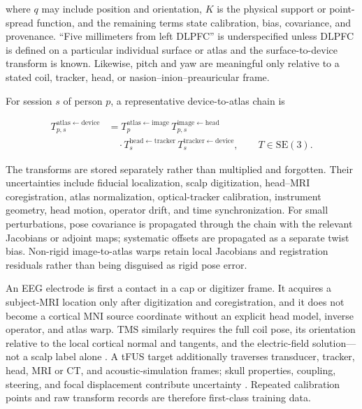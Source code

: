 where \(q\) may include position and orientation, \(K\) is the physical
support or point-spread function, and the remaining terms state calibration,
bias, covariance, and provenance. “Five millimeters from left DLPFC” is
underspecified unless DLPFC is defined on a particular individual surface or
atlas and the surface-to-device transform is known. Likewise, pitch and yaw
are meaningful only relative to a stated coil, tracker, head, or
nasion--inion--preauricular frame.

For session \(s\) of person \(p\), a representative device-to-atlas chain is

\[
\begin{aligned}
T^{\mathrm{atlas}\leftarrow\mathrm{device}}_{p,s}
&=T^{\mathrm{atlas}\leftarrow\mathrm{image}}_{p}\,
T^{\mathrm{image}\leftarrow\mathrm{head}}_{p,s}\\
&\quad{}\cdot
T^{\mathrm{head}\leftarrow\mathrm{tracker}}_{s}\,
T^{\mathrm{tracker}\leftarrow\mathrm{device}}_{s},
\qquad T\in\mathrm{SE}(3).
\end{aligned}
\tag{3}
\]

The transforms are stored separately rather than multiplied and forgotten.
Their uncertainties include fiducial localization, scalp digitization,
head--MRI coregistration, atlas normalization, optical-tracker calibration,
instrument geometry, head motion, operator drift, and time synchronization.
For small perturbations, pose covariance is propagated through the chain with
the relevant Jacobians or adjoint maps; systematic offsets are propagated as a
separate twist bias. Non-rigid image-to-atlas warps retain local Jacobians and
registration residuals rather than being disguised as rigid pose error.

An EEG electrode is first a contact in a cap or digitizer frame. It acquires a
subject-MRI location only after digitization and coregistration, and it does
not become a cortical MNI source coordinate without an explicit head model,
inverse operator, and atlas warp. TMS similarly requires the full coil pose,
its orientation relative to the local cortical normal and tangents, and the
electric-field solution---not a scalp label alone
\citep{caulfield2022,uehara2024}. A tFUS target additionally traverses
transducer, tracker, head, MRI or CT, and acoustic-simulation frames; skull
properties, coupling, steering, and focal displacement contribute uncertainty
\citep{phipps2024}. Repeated calibration points and raw transform records are
therefore first-class training data.

